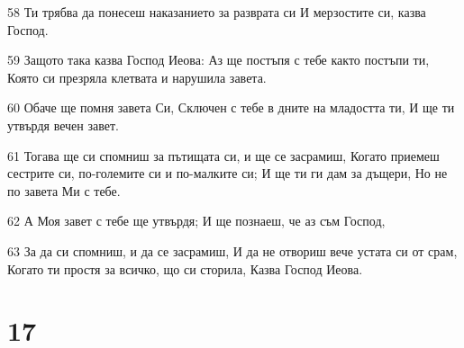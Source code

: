\par 58 Ти трябва да понесеш наказанието за разврата си И мерзостите си, казва Господ.
\par 59 Защото така казва Господ Иеова: Аз ще постъпя с тебе както постъпи ти, Която си презряла клетвата и нарушила завета.
\par 60 Обаче ще помня завета Си, Сключен с тебе в дните на младостта ти, И ще ти утвърдя вечен завет.
\par 61 Тогава ще си спомниш за пътищата си, и ще се засрамиш, Когато приемеш сестрите си, по-големите си и по-малките си; И ще ти ги дам за дъщери, Но не по завета Ми с тебе.
\par 62 А Моя завет с тебе ще утвърдя; И ще познаеш, че аз съм Господ,
\par 63 За да си спомниш, и да се засрамиш, И да не отвориш вече устата си от срам, Когато ти простя за всичко, що си сторила, Казва Господ Иеова.

\chapter{17}

